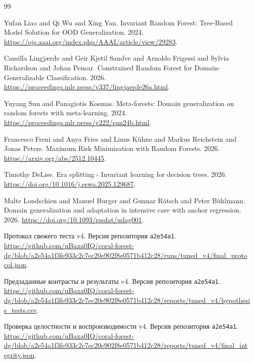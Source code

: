\begin{thebibliography}{99}


 Yufan Liao and Qi Wu and Xing Yan. Invariant Random Forest: Tree-Based Model Solution for OOD Generalization. 2024. \url{https://ojs.aaai.org/index.php/AAAI/article/view/29283}.

 Camilla Lingj{\ae}rde and Geir Kjetil Sandve and Arnoldo Frigessi and Sylvia Richardson and Johan Pensar. Constrained Random Forest for Domain-Generalizable Classification. 2026. \url{https://proceedings.mlr.press/v337/lingjaerde26a.html}.

 Yuyang Sun and Panagiotis Kosmas. Meta-forests: Domain generalization on random forests with meta-learning. 2024. \url{https://proceedings.mlr.press/v222/sun24b.html}.

 Francesco Freni and Anya Fries and Linus K{\"u}hne and Markus Reichstein and Jonas Peters. Maximum Risk Minimization with Random Forests. 2026. \url{https://arxiv.org/abs/2512.10445}.

 Timothy DeLise. Era splitting - Invariant learning for decision trees. 2026. \url{https://doi.org/10.1016/j.eswa.2025.129687}.

 Malte Londschien and Manuel Burger and Gunnar R{\"a}tsch and Peter B{\"u}hlmann. Domain generalization and adaptation in intensive care with anchor regression. 2026. \url{https://doi.org/10.1093/rssdat/udag001}.

 Протокол свежего теста v4. Версия репозитория \texttt{a2e54a1}. \url{https://github.com/uBaxa0IQ/coral-forest-dg/blob/a2e54a1f3fe933c2c7ec20e902f8e0571b412c28/runs/tuned_v4/final_protocol.json}.

 Предзаданные контрасты и результаты v4. Версия репозитория \texttt{a2e54a1}. \url{https://github.com/uBaxa0IQ/coral-forest-dg/blob/a2e54a1f3fe933c2c7ec20e902f8e0571b412c28/reports/tuned_v4/hypothesis_tests.csv}.

 Проверка целостности и воспроизводимости v4. Версия репозитория \texttt{a2e54a1}. \url{https://github.com/uBaxa0IQ/coral-forest-dg/blob/a2e54a1f3fe933c2c7ec20e902f8e0571b412c28/reports/tuned_v4/final_integrity.json}.

\end{thebibliography}
